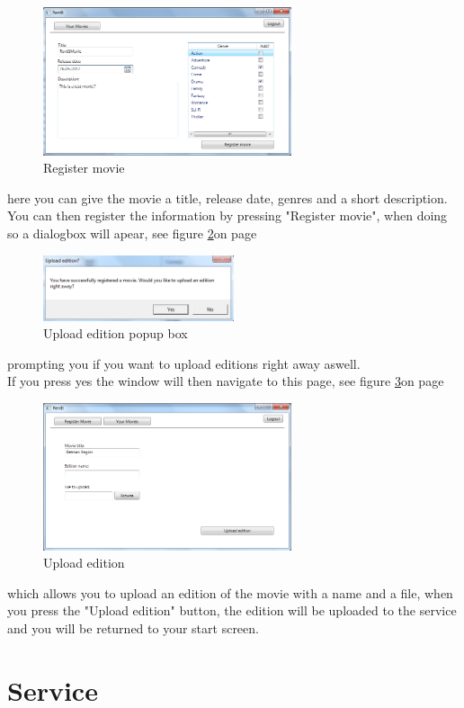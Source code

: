 \begin{figure}[h!]  
\caption{Register movie}
\label{fig:Manual_Client_Navigation_Upload_Register}
  \centering
\includegraphics[width=0.65\textwidth]{Parts/Images/Manual/CPRegistermovie}
\end{figure}
 
 here you can give the movie a title,  release date, genres and a short description. You can then register the information by pressing "Register movie", when doing so a dialogbox will apear, see figure \ref{fig:Manual_Client_Navigation_Upload_Popup}on page \pageref{fig:Manual_Client_Navigation_Upload_Popup}


\begin{figure}[h!]  
\caption{Upload edition popup box}
\label{fig:Manual_Client_Navigation_Upload_Popup}
  \centering
\includegraphics[width=0.5\textwidth]{Parts/Images/Manual/RegisterPopup}
\end{figure}
 
 prompting you if you want to upload editions right away aswell.
\\If you press yes the window will then navigate to this page, see figure \ref{fig:Manual_Client_Navigation_Upload_Edition}on page \pageref{fig:Manual_Client_Navigation_Upload_Edition}


\begin{figure}[h!]  
\caption{Upload edition}
\label{fig:Manual_Client_Navigation_Upload_Edition}
  \centering
\includegraphics[width=0.65\textwidth]{Parts/Images/Manual/CPUploadEdition}
\end{figure}
 
 which allows you to upload an edition of the movie with a name and a file, when you press the "Upload edition" button, the edition will be uploaded to the service and you will be returned to your start screen.

\section{Service}
\label{Manual_Service}